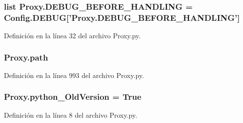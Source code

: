\hypertarget{namespace_proxy_a403844540a843656f16ad342add5c23a}{
\subsubsection[{D\-E\-B\-U\-G\-\_\-\-B\-E\-F\-O\-R\-E\-\_\-\-H\-A\-N\-D\-L\-I\-N\-G}]{\setlength{\rightskip}{0pt plus 5cm}list Proxy.\-D\-E\-B\-U\-G\-\_\-\-B\-E\-F\-O\-R\-E\-\_\-\-H\-A\-N\-D\-L\-I\-N\-G = {\bf Config.\-D\-E\-B\-U\-G}\mbox{[}'Proxy.\-D\-E\-B\-U\-G\-\_\-\-B\-E\-F\-O\-R\-E\-\_\-\-H\-A\-N\-D\-L\-I\-N\-G'\mbox{]}}}\label{namespace_proxy_a403844540a843656f16ad342add5c23a}


Definición en la línea 32 del archivo Proxy.\-py.

\hypertarget{namespace_proxy_a2d23bcf24b7c5e920bbcbb96a341b01a}{
\subsubsection[{path}]{\setlength{\rightskip}{0pt plus 5cm}Proxy.\-path}}\label{namespace_proxy_a2d23bcf24b7c5e920bbcbb96a341b01a}


Definición en la línea 993 del archivo Proxy.\-py.

\hypertarget{namespace_proxy_a71cbd99af8c17ead847d851d5adee87c}{
\subsubsection[{python\-\_\-\-Old\-Version}]{\setlength{\rightskip}{0pt plus 5cm}Proxy.\-python\-\_\-\-Old\-Version = True}}\label{namespace_proxy_a71cbd99af8c17ead847d851d5adee87c}


Definición en la línea 8 del archivo Proxy.\-py.

